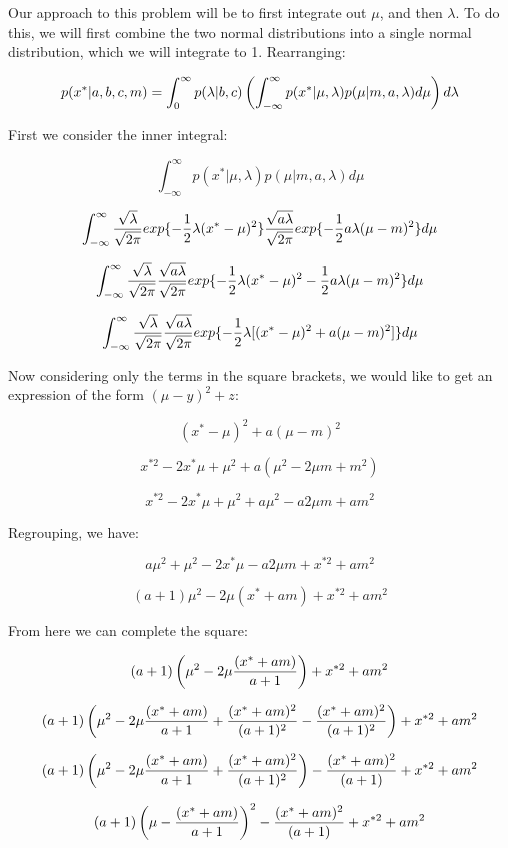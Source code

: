 \documentclass[twoside,11pt]{homework}
\begin{document}
Our approach to this problem will be to first integrate out $\mu$, and then $\lambda$.
To do this, we will first combine the two normal distributions into a single normal distribution, which we will integrate to 1. Rearranging:

\[
p(x^*|a, b, c, m) =
\int_{0}^{\infty} p(\lambda | b, c )\left(\int_{-\infty}^{\infty} p(x^*|\mu, \lambda)p(\mu | m, a, \lambda) d\mu\right) d\lambda
\]

First we consider the inner integral:

\[
\int_{-\infty}^{\infty} p(x^*|\mu, \lambda)p(\mu | m, a, \lambda) d\mu
\]


\[
\int_{-\infty}^{\infty}
\frac{\sqrt{\lambda}}{\sqrt{2\pi}}
exp\{-\frac{1}{2}\lambda(x^* - \mu)^2\}
\frac{\sqrt{a\lambda}}{\sqrt{2\pi}}
exp\{-\frac{1}{2}a\lambda(\mu - m)^2\}
d\mu
\]

\[
\int_{-\infty}^{\infty}
\frac{\sqrt{\lambda}}{\sqrt{2\pi}}
\frac{\sqrt{a\lambda}}{\sqrt{2\pi}}
exp\{-\frac{1}{2}\lambda(x^* - \mu)^2 -\frac{1}{2}a\lambda(\mu - m)^2\}
d\mu
\]

\[
\int_{-\infty}^{\infty}
\frac{\sqrt{\lambda}}{\sqrt{2\pi}}
\frac{\sqrt{a\lambda}}{\sqrt{2\pi}}
exp\{-\frac{1}{2}\lambda[(x^* - \mu)^2 + a(\mu - m)^2]\}
d\mu
\]

Now considering only the terms in the square brackets,
we would like to get an expression of the form $(\mu - y)^2 + z$:

\[
(x^* - \mu)^2 + a(\mu - m)^2
\]

\[
x^{*2} - 2x^*\mu + \mu^2 + a(\mu^2 - 2\mu m + m^2)
\]


\[
x^{*2} - 2x^*\mu + \mu^2 + a\mu^2 - a2\mu m + am^2
\]

Regrouping, we have:

\[
a\mu^2 + \mu^2 - 2x^*\mu - a2\mu m + x^{*2} + am^2
\]

\[
(a + 1)\mu^2 - 2\mu(x^* + am) + x^{*2} + am^2
\]

From here we can complete the square:

\[
(a + 1)\left(\mu^2 - 2\mu\frac{(x^* + am)}{a+1}\right) + x^{*2} + am^2
\]

\[
(a + 1)
\left(\mu^2 - 2\mu\frac{(x^* + am)}{a+1} + \frac{(x^* + am)^2}{(a+1)^2} - \frac{(x^* + am)^2}{(a+1)^2}\right)
 + x^{*2} + am^2
\]

\[
(a + 1)
\left(\mu^2 - 2\mu\frac{(x^* + am)}{a+1} + \frac{(x^* + am)^2}{(a+1)^2}\right)
- \frac{(x^* + am)^2}{(a+1)} + x^{*2} + am^2
\]

\[
(a + 1)
\left(\mu - \frac{(x^* + am)}{a+1}\right)^2
- \frac{(x^* + am)^2}{(a+1)} + x^{*2} + am^2
\]
\end{document}
